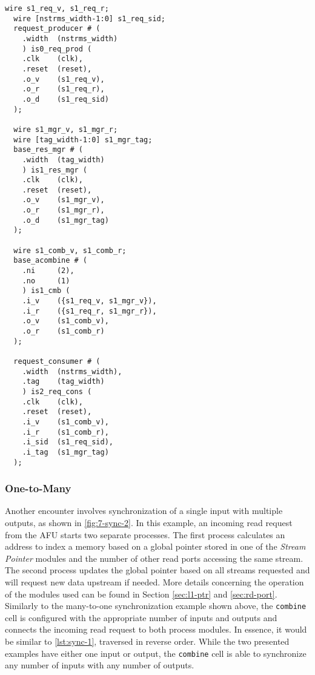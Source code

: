 \begin{lstlisting}[style={verilog-style}, caption=Many-to-One synchronization example., label=lst:sync-1]
  wire s1_req_v, s1_req_r;
  wire [nstrms_width-1:0] s1_req_sid;
  request_producer # (
    .width  (nstrms_width)
    ) is0_req_prod (
    .clk    (clk),
    .reset  (reset),
    .o_v    (s1_req_v),
    .o_r    (s1_req_r),
    .o_d    (s1_req_sid)
  );

  wire s1_mgr_v, s1_mgr_r;
  wire [tag_width-1:0] s1_mgr_tag;
  base_res_mgr # (
    .width  (tag_width)
    ) is1_res_mgr (
    .clk    (clk),
    .reset  (reset),
    .o_v    (s1_mgr_v),
    .o_r    (s1_mgr_r),
    .o_d    (s1_mgr_tag)
  );

  wire s1_comb_v, s1_comb_r;
  base_acombine # (
    .ni     (2),
    .no     (1)
    ) is1_cmb (
    .i_v    ({s1_req_v, s1_mgr_v}),
    .i_r    ({s1_req_r, s1_mgr_r}),
    .o_v    (s1_comb_v),
    .o_r    (s1_comb_r)
  );

  request_consumer # (
    .width  (nstrms_width),
    .tag    (tag_width)
    ) is2_req_cons (
    .clk    (clk),
    .reset  (reset),
    .i_v    (s1_comb_v),
    .i_r    (s1_comb_r),
    .i_sid  (s1_req_sid),
    .i_tag  (s1_mgr_tag)
  );
\end{lstlisting}



\subsubsection{One-to-Many}
Another encounter involves synchronization of a single input with multiple outputs, as shown in \autoref{fig:7-sync-2}. In this example, an incoming read request from the AFU starts two separate processes. The first process calculates an address to index a memory based on a global pointer stored in one of the \textit{Stream Pointer} modules and the number of other read ports accessing the same stream. The second process updates the global pointer based on all streams requested and will request new data upstream if needed. More details concerning the operation of the modules used can be found in Section \ref{sec:l1-ptr} and \ref{sec:rd-port}.\\
Similarly to the many-to-one synchronization example shown above, the \texttt{combine} cell is configured with the appropriate number of inputs and outputs and connects the incoming read request to both process modules. In essence, it would be similar to \autoref{lst:sync-1}, traversed in reverse order. While the two presented examples have either one input or output, the \texttt{combine} cell is able to synchronize any number of inputs with any number of outputs.

